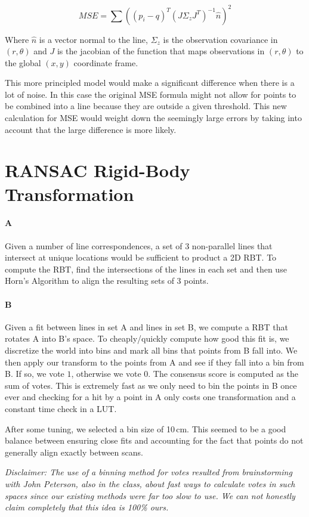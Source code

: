 \documentclass[12pt]{article}
\begin{document}
\[MSE = \sum{\left((p_i-q)^T\left(J\Sigma_zJ^T\right)^{-1}\hat{n}\right)^2} \]

Where $\hat{n}$ is a vector normal to the line, $\Sigma_z$ is the observation covariance in $(r,\theta)$ and $J$ is the jacobian of the function that maps observations in $(r,\theta)$ to the global $(x,y)$ coordinate frame.

This more principled model would make a significant difference when there is a lot of noise.  In this case the original MSE formula might not allow for points to be combined into a line because they are outside a given threshold.  This new calculation for MSE would weight down the seemingly large errors by taking into account that the large difference is more likely. 
\section{RANSAC Rigid-Body Transformation}

\paragraph{A}
Given a number of line correspondences, a set of 3 non-parallel lines that
intersect at unique locations would be sufficient to product a 2D RBT. To
compute the RBT, find the intersections of the lines in each set and then
use Horn's Algorithm to align the resulting sets of 3 points.

\paragraph{B}
Given a fit between lines in set A and lines in set B, we compute a RBT that
rotates A into B's space. To cheaply/quickly compute how good this fit is,
we discretize the world into bins and mark all bins that points from B fall
into. We then apply our transform to the points from A and see if they fall
into a bin from B. If so, we vote $1$, otherwise we vote $0$. The consensus
score is computed as the sum of votes. This is extremely fast as we only need
to bin the points in B once ever and checking for a hit by a point in A only
costs one transformation and a constant time check in a LUT.

After some tuning, we selected a bin size of 10\,cm. This seemed to be a good
balance between ensuring close fits and accounting for the fact that points do
not generally align exactly between scans.

\emph{Disclaimer: The use of a binning method for votes resulted from brainstorming with John Peterson,
    also in the class, about fast ways to calculate votes in such spaces since our existing methods
    were far too slow to use. We can not honestly claim completely that this idea is 100\% ours.}
\end{document}

